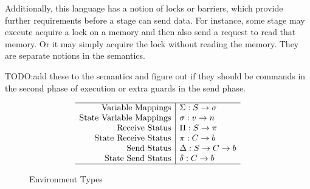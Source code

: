 \documentclass{article}
\begin{document}
Additionally, this language has a notion of locks or barriers,
which provide further requirements before a stage can send data.
For instance, some stage may execute acquire a lock
on a memory and then also send a request to read that memory.
Or it may simply acquire the lock without reading the memory.
They are separate notions in the semantics.

TODO:add these to the semantics and figure out if they should
be commands in the second phase of execution or extra guards in the send phase.

\begin{figure}
  \[\begin{array}{r|l} \hline
    \text{Variable Mappings} & \Sigma: S \rightarrow \sigma \\
    \text{State Variable Mappings} & \sigma: v \rightarrow n \\
    \text{Receive Status} & \Pi: S \rightarrow \pi \\
    \text{State Receive Status} & \pi: C \rightarrow b \\
    \text{Send Status} & \Delta: S \rightarrow C \rightarrow b \\
    \text{State Send Status} & \delta: C \rightarrow b \\ \hline
  \end{array}\]
  \caption{Environment Types}
\end{figure}
\end{document}
